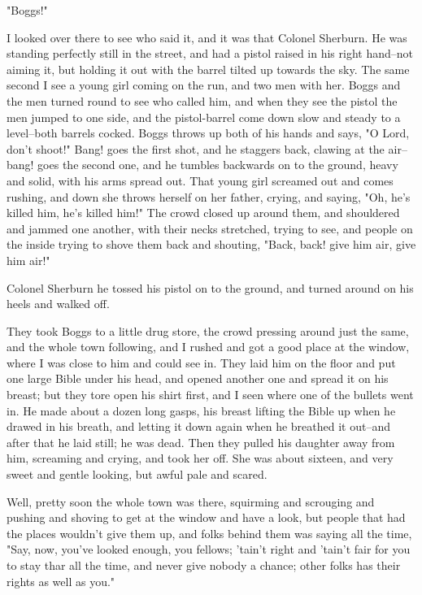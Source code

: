 "Boggs!"

I looked over there to see who said it, and it was that Colonel Sherburn.
He was standing perfectly still in the street, and had a pistol raised in
his right hand--not aiming it, but holding it out with the barrel tilted
up towards the sky.  The same second I see a young girl coming on the
run, and two men with her.  Boggs and the men turned round to see who
called him, and when they see the pistol the men jumped to one side, and
the pistol-barrel come down slow and steady to a level--both barrels
cocked. Boggs throws up both of his hands and says, "O Lord, don't
shoot!"  Bang! goes the first shot, and he staggers back, clawing at the
air--bang! goes the second one, and he tumbles backwards on to the
ground, heavy and solid, with his arms spread out.  That young girl
screamed out and comes rushing, and down she throws herself on her
father, crying, and saying, "Oh, he's killed him, he's killed him!"  The
crowd closed up around them, and shouldered and jammed one another, with
their necks stretched, trying to see, and people on the inside trying to
shove them back and shouting, "Back, back! give him air, give him air!"

Colonel Sherburn he tossed his pistol on to the ground, and turned around
on his heels and walked off.

They took Boggs to a little drug store, the crowd pressing around just
the same, and the whole town following, and I rushed and got a good place
at the window, where I was close to him and could see in.  They laid him
on the floor and put one large Bible under his head, and opened another
one and spread it on his breast; but they tore open his shirt first, and
I seen where one of the bullets went in.  He made about a dozen long
gasps, his breast lifting the Bible up when he drawed in his breath, and
letting it down again when he breathed it out--and after that he laid
still; he was dead.  Then they pulled his daughter away from him,
screaming and crying, and took her off.  She was about sixteen, and very
sweet and gentle looking, but awful pale and scared.

Well, pretty soon the whole town was there, squirming and scrouging and
pushing and shoving to get at the window and have a look, but people that
had the places wouldn't give them up, and folks behind them was saying
all the time, "Say, now, you've looked enough, you fellows; 'tain't right
and 'tain't fair for you to stay thar all the time, and never give nobody
a chance; other folks has their rights as well as you."

